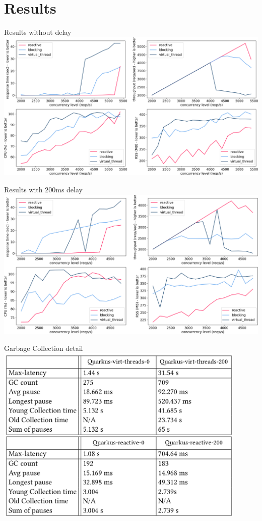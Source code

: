 \documentclass{beamer}
\begin{document}
\section{Results}
\begin{frame}{Results without delay}
    \includegraphics[width=\textwidth]{assets/nano_baseline_19.0.1.png}
\end{frame}
\begin{frame}{Results with 200ms delay}
    \includegraphics[width=\textwidth]{assets/nano_200_19.0.1.png}
\end{frame}
\begin{frame}{Garbage Collection detail}
    \includegraphics[width=0.9\textwidth]{assets/GC_measures.png}
\end{frame}
\end{document}
